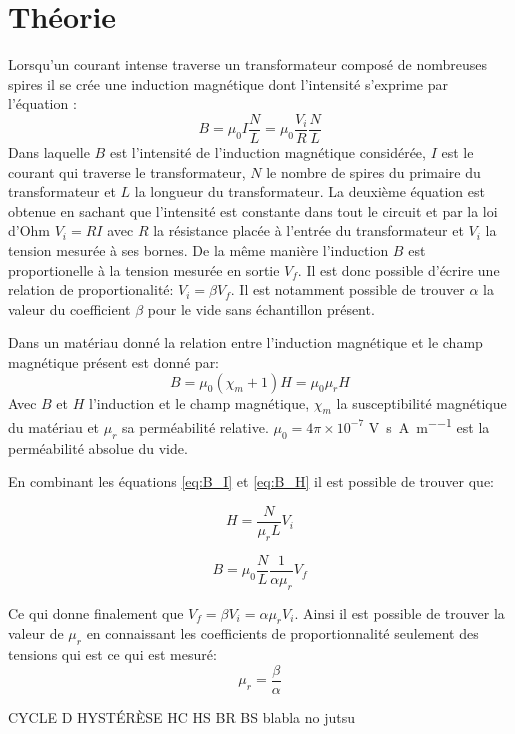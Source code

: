 \section{Théorie}

Lorsqu'un courant intense traverse un transformateur composé de nombreuses spires il se crée une induction magnétique dont l'intensité s'exprime par l'équation \cite{assistant}:
\begin{equation}
    B = \mu_0 I \frac{N}{L} = \mu_0 \frac{V_i}{R} \frac{N}{L}
    \label{eq:B_I}
\end{equation}
Dans laquelle \(B\) est l'intensité de l'induction magnétique considérée, \(I\) est le courant qui traverse le transformateur, \(N\) le nombre de spires du primaire du transformateur et \(L\) la longueur du transformateur. La deuxième équation est obtenue en sachant que l'intensité est constante dans tout le circuit et par la loi d'Ohm \(V_i = RI\) avec \(R\) la résistance placée à l'entrée du transformateur et \(V_i\) la tension mesurée à ses bornes.
De la même manière l'induction \(B\) est proportionelle à la tension mesurée en sortie \(V_f\). Il est donc possible d'écrire une relation de proportionalité: \(V_i = \beta V_f\). Il est notamment possible de trouver \(\alpha\) la valeur du coefficient \(\beta\) pour le vide sans échantillon présent.

Dans un matériau donné la relation entre l'induction magnétique et le champ magnétique présent est donné par:
\begin{equation}
    B = \mu_0 (\chi_m + 1) H = \mu_0 \mu_r H
    \label{eq:B_H}
\end{equation}
Avec \(B\) et \(H\) l'induction et le champ magnétique, \(\chi_m\) la susceptibilité magnétique du matériau et \(\mu_r\) sa perméabilité relative. \(\mu_0 = 4\pi \times 10^{-7}\) \si{\volt\second \per\ampere\per\meter} est la perméabilité absolue du vide.


En combinant les équations \autoref{eq:B_I} et \autoref{eq:B_H} il est possible de trouver que:

\begin{equation}
    H = \frac{N}{\mu_r L} V_i
    \label{eq:calibr_H}
\end{equation}

\begin{equation}
    B = \mu_0 \frac{N}{L} \frac{1}{\alpha \mu_r} V_f
    \label{eq:calibr_B}
\end{equation}

Ce qui donne finalement que \(V_f = \beta V_i = \alpha \mu_r V_i\). Ainsi il est possible de trouver la valeur de \(\mu_r\) en connaissant les coefficients de proportionnalité seulement des tensions qui est ce qui est mesuré:
\begin{equation} 
    \mu_r = \frac{\beta}{\alpha}
    \label{eq:mu_r}
\end{equation}
     
CYCLE D HYSTÉRÈSE HC HS BR BS blabla no jutsu
